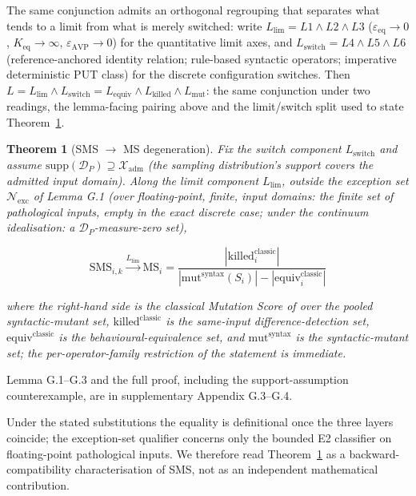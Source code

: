 \documentclass[review,12pt,authoryear]{elsarticle}
\newtheorem{theorem}{Theorem}
\begin{document}
The same conjunction admits an orthogonal regrouping that separates what
tends to a limit from what is merely switched: write
$L_{\mathrm{lim}} = L1 \wedge L2 \wedge L3$
($\varepsilon_{\mathrm{eq}} \to 0$, $K_{\mathrm{eq}} \to \infty$,
$\varepsilon_{\mathrm{AVP}} \to 0$) for the quantitative limit axes, and
$L_{\mathrm{switch}} = L4 \wedge L5 \wedge L6$ (reference-anchored
identity relation; rule-based syntactic operators; imperative
deterministic PUT class) for the discrete configuration switches. Then
$L = L_{\mathrm{lim}} \wedge L_{\mathrm{switch}} = L_{\mathrm{equiv}} \wedge L_{\mathrm{killed}} \wedge L_{\mathrm{mut}}$:
the same conjunction under two readings, the lemma-facing pairing above
and the limit/switch split used to state Theorem~\ref{thm:degeneration}.

\begin{theorem}[SMS $\to$ MS degeneration]\label{thm:degeneration}
Fix the switch component $L_{\mathrm{switch}}$ and assume
$\mathrm{supp}(\mathcal{D}_P) \supseteq \mathcal{X}_{\mathrm{adm}}$ (the
sampling distribution's support covers the admitted input domain). Along
the limit component $L_{\mathrm{lim}}$, outside the exception set
$\mathcal{N}_{\mathrm{exc}}$ of Lemma G.1 (over floating-point, finite,
input domains: the finite set of pathological inputs, empty in the exact
discrete case; under the continuum idealisation: a
$\mathcal{D}_P$-measure-zero set),

\[ \mathrm{SMS}_{i,k} \xrightarrow{L_{\mathrm{lim}}} \mathrm{MS}_{i} = \frac{|\mathrm{killed}_{i}^{\mathrm{classic}}|}{|\mathrm{mut}^{\mathrm{syntax}}(S_i)| - |\mathrm{equiv}_{i}^{\mathrm{classic}}|} \]

where the right-hand side is the classical Mutation Score of
\citet{d7c38286734419b52de4262c9802ebdfcf4b9447} over the pooled syntactic-mutant set,
$\mathrm{killed}^{\mathrm{classic}}$ is the same-input
difference-detection set,
$\mathrm{equiv}^{\mathrm{classic}}$ is the behavioural-equivalence set,
and $\mathrm{mut}^{\mathrm{syntax}}$ is the syntactic-mutant set; the
per-operator-family restriction of the statement is immediate.
\end{theorem}

Lemma G.1--G.3 and the full proof, including the support-assumption
counterexample, are in supplementary Appendix G.3--G.4.

Under the stated substitutions the equality is definitional once the
three layers coincide; the exception-set qualifier concerns only
the bounded E2 classifier on floating-point pathological inputs. We
therefore read Theorem~\ref{thm:degeneration} as a
backward-compatibility characterisation of SMS, not as an independent
mathematical contribution.
\end{document}
